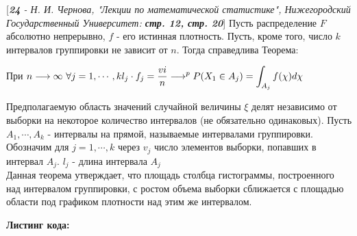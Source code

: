 \documentclass[14pt,a4paper,oneside]{extbook}
\begin{document}
      [\textit{\textbf{24} - Н. И. Чернова, "Лекции по математической статистике", Нижегородский Государственный Университет: \textbf{стр. 12, стр. 20}}] Пусть распределение $F$ абсолютно непрерывно, $f$ - его истинная плотность. Пусть, кроме того, число $k$ интервалов группировки не зависит от $n$. Тогда справедлива Теорема:\\
      \begin{center}
          При $\displaystyle n \longrightarrow \infty \textrm{  } \forall j = 1,\cdots,k \\
          \displaystyle l_{j}\cdot f_{j} = \frac{v{i}}{n} \longrightarrow^{p} P(X_{1} \in A_{j}) = \int_{A_{j}}f(\chi)d\chi$
      \end{center}
    Предполагаемую область значений случайной величины $\xi$ делят независимо от выборки на некоторое количество интервалов (не обязательно одинаковых). Пусть $A_{1},\cdots, A_{k}$ - интервалы на прямой, называемые интервалами группировки. Обозначим для $j = 1,\cdots,k$ через $v_{j}$ число элементов выборки, попавших в интервал $A_{j}$. $l_{j}$ - длина интервала $A_{j}$\\
    Данная теорема утверждает, что площадь столбца гистограммы, построенного над интервалом группировки, с ростом объема выборки сближается с площадью области под графиком плотности над этим же интервалом.
  \begin{center}
    \end{center}

    \textbf{Листинг кода:} \\
    
    
    \newpage
\end{document}

